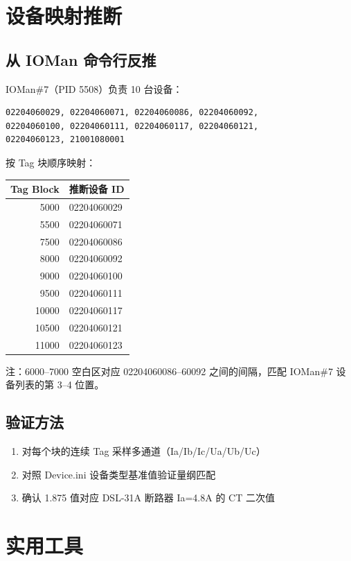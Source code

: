 \documentclass[12pt,a4paper]{ctexart}
\begin{document}
\section{设备映射推断}

\subsection{从 IOMan 命令行反推}
IOMan\#7（PID 5508）负责 10 台设备：
\begin{verbatim}
02204060029, 02204060071, 02204060086, 02204060092,
02204060100, 02204060111, 02204060117, 02204060121,
02204060123, 21001080001
\end{verbatim}

按 Tag 块顺序映射：
\begin{table}[H]\centering
\begin{tabular}{rl}
\toprule
\textbf{Tag Block} & \textbf{推断设备 ID} \\
\midrule
5000 & 02204060029 \\
5500 & 02204060071 \\
7500 & 02204060086 \\
8000 & 02204060092 \\
9000 & 02204060100 \\
9500 & 02204060111 \\
10000 & 02204060117 \\
10500 & 02204060121 \\
11000 & 02204060123 \\
\bottomrule
\end{tabular}
\end{table}

注：6000--7000 空白区对应 02204060086--60092 之间的间隔，匹配 IOMan\#7 设备列表的第 3--4 位置。

\subsection{验证方法}
\begin{enumerate}[leftmargin=*]
  \item 对每个块的连续 Tag 采样多通道（Ia/Ib/Ic/Ua/Ub/Uc）
  \item 对照 Device.ini 设备类型基准值验证量纲匹配
  \item 确认 1.875 值对应 DSL-31A 断路器 Ia=4.8A 的 CT 二次值
\end{enumerate}

\section{实用工具}
\end{document}

